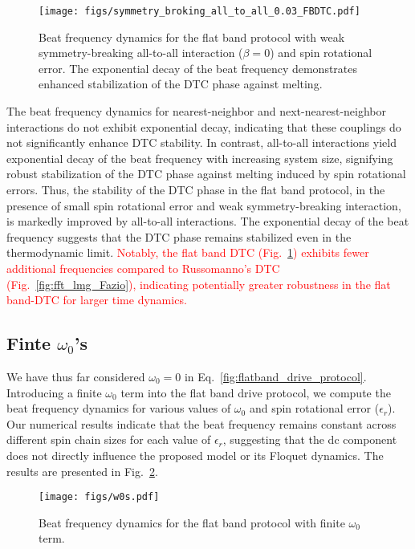 \documentclass[a4paper,10pt]{article}
\newcommand{\red}[1]{\textcolor{red}{#1}}
\begin{document}
\begin{figure}[h]
    \centering
    \texttt{[image: figs/symmetry\_broking\_all\_to\_all\_0.03\_FBDTC.pdf]}
    \caption{Beat frequency dynamics for the flat band protocol with weak symmetry-breaking all-to-all interaction ($\beta = 0$) and spin rotational error. The exponential decay of the beat frequency demonstrates enhanced stabilization of the DTC phase against melting.}
    \label{fig:symmetry_broking_all_to_all}
\end{figure}

\noindent The beat frequency dynamics for nearest-neighbor and next-nearest-neighbor interactions do not exhibit exponential decay, indicating that these couplings do not significantly enhance DTC stability. In contrast, all-to-all interactions yield exponential decay of the beat frequency with increasing system size, signifying robust stabilization of the DTC phase against melting induced by spin rotational errors. Thus, the stability of the DTC phase in the flat band protocol, in the presence of small spin rotational error and weak symmetry-breaking interaction, is markedly improved by all-to-all interactions. The exponential decay of the beat frequency suggests that the DTC phase remains stabilized even in the thermodynamic limit. \red{Notably, the flat band DTC (Fig.~\ref{fig:symmetry_broking_all_to_all}) exhibits fewer additional frequencies compared to Russomanno's DTC (Fig.~\ref{fig:fft_lmg_Fazio}), indicating potentially greater robustness in the flat band-DTC for larger time dynamics.}

\subsection{Finte $\omega_0$'s}
We have thus far considered $\omega_0 = 0$ in Eq.~\eqref{fig:flatband_drive_protocol}. Introducing a finite $\omega_0$ term into the flat band drive protocol, we compute the beat frequency dynamics for various values of $\omega_0$ and spin rotational error ($\epsilon_r$). Our numerical results indicate that the beat frequency remains constant across different spin chain sizes for each value of $\epsilon_r$, suggesting that the dc component does not directly influence the proposed model or its Floquet dynamics. The results are presented in Fig.~\ref{fig:beat_frequency_omega0}.
\begin{figure}[h]
    \centering
    \texttt{[image: figs/w0s.pdf]}
    \caption{Beat frequency dynamics for the flat band protocol with finite $\omega_0$ term.}
    \label{fig:beat_frequency_omega0}
\end{figure}
\end{document}

